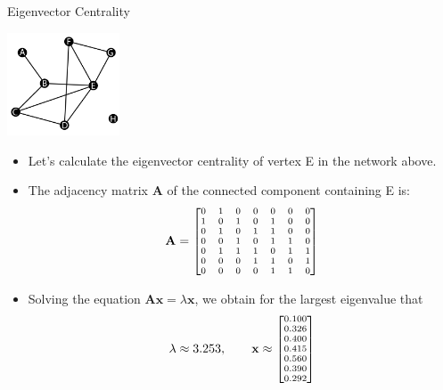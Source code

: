 \documentclass[9pt,handout]{beamer}
\let\olditem\item
\renewcommand{\item}{\olditem\vfill}
\begin{document}
\begin{frame}{Eigenvector Centrality}
  \begin{center}
    \includegraphics[width=0.25\textwidth]{week_02_lecture_img_01}
  \end{center}    
  \begin{itemize}
    \item Let's calculate the eigenvector centrality of vertex E in the network above.
    \item The adjacency matrix $\mathbf{A}$ of the connected component containing E is:
    \[
    \mathbf{A} = \scriptsize\begin{bmatrix}
    0 & 1 & 0 & 0 & 0 & 0 & 0 \\
    1 & 0 & 1 & 0 & 1 & 0 & 0 \\
    0 & 1 & 0 & 1 & 1 & 0 & 0 \\
    0 & 0 & 1 & 0 & 1 & 1 & 0 \\
    0 & 1 & 1 & 1 & 0 & 1 & 1 \\
    0 & 0 & 0 & 1 & 1 & 0 & 1 \\
    0 & 0 & 0 & 0 & 1 & 1 & 0 \\
    \end{bmatrix}
    \]
    \item Solving the equation $\mathbf{Ax} = \lambda \mathbf{x}$, we obtain for the largest eigenvalue that   
    \[
    \lambda \approx 3.253,\qquad \mathbf{x} \approx \scriptsize\begin{bmatrix}
      0.100 \\
      0.326 \\
      0.400 \\
      0.415 \\
      0.560 \\
      0.390 \\
      0.292 \\
      \end{bmatrix}
    \]
  \end{itemize}
\end{frame}
\end{document}
